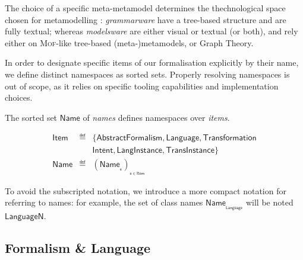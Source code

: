 The choice of a specific meta-metamodel determines the thechnological space 
chosen for metamodelling \cite{Wimmer-Kramler:2005}: \emph{grammarware} have a 
tree-based structure and are fully textual; whereas \emph{modelsware} are either 
visual or textual (or both), and rely either on \textsc{Mof}-like tree-based 
(meta-)metamodels, or Graph Theory. 



In order to designate specific items of our formalisation explicitly by their 
name, we define distinct namespaces as sorted sets. Properly resolving 
namespaces is out of scope, as it relies on specific tooling 
capabilities and implementation choices.

\begin{Definition}[Names]
   The sorted set $\mathsf{Name}$ of \emph{names} defines namespaces over 
\emph{items}.
   \begin{small}
   \begin{displaymath}
     \begin{array}{rcl}
		\mathsf{Item} & \eqdef & \{\mathsf{AbstractFormalism}, \mathsf{Language}, 
\mathsf{Transformation}\\
                    &        & \mathsf{Intent}, \mathsf{LangInstance}, 
\mathsf{TransInstance}\}\\
		\mathsf{Name}    & \eqdef & (\mathsf{Name}_{_{\mathsf{e}}})_{_{\mathsf{e} 
\in \mathsf{Item}}}
      \end{array}
\end{displaymath}
   \end{small}
\end{Definition}
To avoid the subscripted notation, we introduce a more compact notation for 
referring to names: for example, the set of class names 
$\mathsf{Name_{_{Language}}}$ will be noted $\mathsf{LanguageN}$.  

\subsection{Formalism \& Language}
\label{sec:Formalism-Language}

